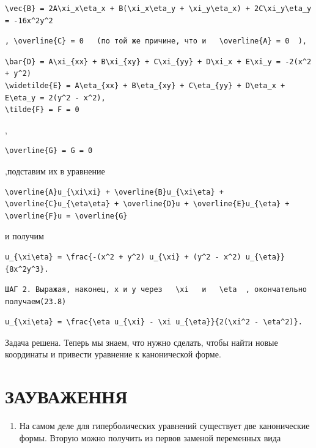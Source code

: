 \documentclass[
  ukrainian,
]{article}
\providecommand{\tightlist}{%
  \setlength{\itemsep}{0pt}\setlength{\parskip}{0pt}}
\begin{document}
\begin{verbatim}
\vec{B} = 2A\xi_x\eta_x + B(\xi_x\eta_y + \xi_y\eta_x) + 2C\xi_y\eta_y = -16x^2y^2
\end{verbatim}

\begin{verbatim}
, \overline{C} = 0   (по той же причине, что и   \overline{A} = 0  ),
\end{verbatim}

\begin{verbatim}
\bar{D} = A\xi_{xx} + B\xi_{xy} + C\xi_{yy} + D\xi_x + E\xi_y = -2(x^2 + y^2)
\widetilde{E} = A\eta_{xx} + B\eta_{xy} + C\eta_{yy} + D\eta_x + E\eta_y = 2(y^2 - x^2),
\tilde{F} = F = 0
\end{verbatim}

,

\begin{verbatim}
\overline{G} = G = 0
\end{verbatim}

,подставим их в уравнение

\begin{verbatim}
\overline{A}u_{\xi\xi} + \overline{B}u_{\xi\eta} + \overline{C}u_{\eta\eta} + \overline{D}u + \overline{E}u_{\eta} + \overline{F}u = \overline{G}
\end{verbatim}

и получим

\begin{verbatim}
u_{\xi\eta} = \frac{-(x^2 + y^2) u_{\xi} + (y^2 - x^2) u_{\eta}}{8x^2y^3}.
\end{verbatim}

\begin{verbatim}
ШАГ 2. Выражая, наконец, x и y через   \xi   и   \eta  , окончательно получаем(23.8)
\end{verbatim}

\begin{verbatim}
u_{\xi\eta} = \frac{\eta u_{\xi} - \xi u_{\eta}}{2(\xi^2 - \eta^2)}.
\end{verbatim}

Задача решена. Теперь мы знаем, что нужно сделать, чтобы найти новые
координаты и привести уравнение к канонической форме.

\section{ЗАУВАЖЕННЯ}\label{ux437ux430ux443ux432ux430ux436ux435ux43dux43dux44f}

\begin{enumerate}
\def\labelenumi{\arabic{enumi}.}
\tightlist
\item
  На самом деле для гиперболических уравнений существует две
  канонические формы. Вторую можно получить из первов заменой переменных
  вида
\end{enumerate}
\end{document}
